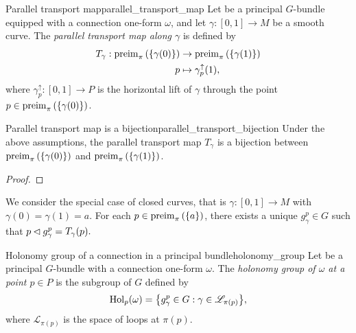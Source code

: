 \begin{definition}{Parallel transport map}{parallel_transport_map}
    Let  be a principal \(G\)-bundle equipped with a connection one-form \(\omega\), and let \(\gamma : [0,1] \to M\) be a smooth curve. The \emph{parallel transport map along \(\gamma\)} is defined by
    \begin{align*}
        T_{\gamma} : \operatorname{preim}_{\pi}{\left(\{\gamma(0)\}\right)} &\to \operatorname{preim}_{\pi}{\left(\{\gamma(1)\}\right)}\\
                                                p &\mapsto \gamma_p^\uparrow(1),
    \end{align*}
    where \(\gamma_p^\uparrow : [0,1] \to P\) is the horizontal lift of \(\gamma\) through the point \(p \in \operatorname{preim}_{\pi}{\left(\{\gamma(0)\}\right)}\).
\end{definition}

\begin{proposition}{Parallel transport map is a bijection}{parallel_transport_bijection}
    Under the above assumptions, the parallel transport map \(T_{\gamma}\) is a bijection between \(\operatorname{preim}_{\pi}{\left(\{\gamma(0)\}\right)}\) and  \(\operatorname{preim}_{\pi}{\left(\{\gamma(1)\}\right)}\).
\end{proposition}
\begin{proof}
    \todo[Due to \(\pf{(\ract g)}{H_pP} = H_{p \ract g}P.\)]
\end{proof}

We consider the special case of closed curves, that is \(\gamma : [0,1] \to M\) with \(\gamma(0) = \gamma(1) = a.\) For each \(p \in \operatorname{preim}_{\pi}{\left(\{a\}\right)}\), there exists a unique \(g^p_{\gamma} \in G\) such that \(p \mathbin{\vartriangleleft} g^p_{\gamma} = T_{\gamma}(p).\)

\begin{definition}{Holonomy group of a connection in a principal bundle}{holonomy_group}
    Let  be a principal \(G\)-bundle with a connection one-form \(\omega\). The \emph{holonomy group of \(\omega\) at a point \(p \in P\)} is the subgroup of \(G\) defined by
    \begin{equation*}
        \mathrm{Hol}_p(\omega) = \set*{g^p_{\gamma} \in G : \gamma \in \mathscr{L}_{\pi(p)}},
    \end{equation*}
    where \(\mathscr{L}_{\pi(p)}\) is the space of loops at \(\pi(p).\)
\end{definition}

